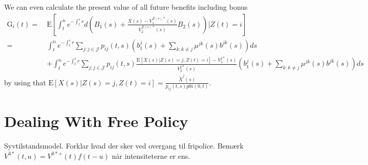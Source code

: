 \documentclass[12pt]{article}
\newcommand{\E}{\text{E}}
\theoremstyle{my_thm}
\theoremstyle{my_rem}
\begin{document}
We can even calculate the present value of all future benefits including bonus
\begin{align*}
\text{G}_i(t)= \ &\E \left[ \int_t^n e^{-\int_t^s r} d \left( B_1(s)+\frac{X(s)-V_1^{Z(s)*}(s)}{V_2^{Z(s)*}(s)}B_2(s) \right) \big|Z(t)=i \right]
\\
= \ &
\int_t^n e^{-\int_t^s r} \sum_{j:j \in \mathcal{J}} p_{ij}(t,s) \left( b_1^j(s)+ \sum_{k:k\neq j} \mu^{jk}(s) b^{jk}(s)  \right) ds
\\
&+
\int_t^n e^{-\int_t^s r} \sum_{j:j \in \mathcal{J}} p_{ij}(t,s) \frac{\E[X(s)|Z(s)=j,Z(t)=i]-V_1^{j*}(s)}{V_2^{j*}(s)}\left( b_1^j(s)+ \sum_{k:k\neq j} \mu^{jk}(s) b^{jk}(s)  \right) ds
\end{align*}
by using that $\E[X(s)|Z(s)=j,Z(t)=i]=\frac{\tilde{X}^j(s)}{p_{ij}(t,s)p{0i}(0,t)}$.
\fi


\newpage

\iffalse



\section{Dealing With Free Policy}
Syvtilstandsmodel. Forklar hvad der sker ved overgang til fripolice. Bemærk $V^{3*}(t,u)=V^{0*+}(t)f(t-u)$ når intensiteterne er ens.\\
\end{document}
